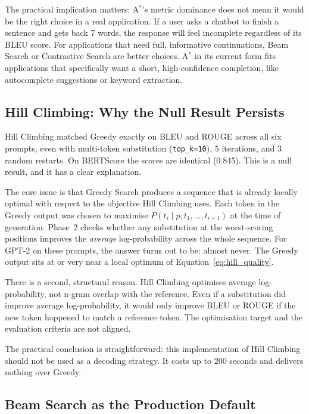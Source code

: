 \documentclass[12pt]{article}
\begin{document}
	The practical implication matters: A$^*$'s metric dominance does not mean it would be the right choice in a real application. If a user asks a chatbot to finish a sentence and gets back 7 words, the response will feel incomplete regardless of its BLEU score. For applications that need full, informative continuations, Beam Search or Contrastive Search are better choices. A$^*$ in its current form fits applications that specifically want a short, high-confidence completion, like autocomplete suggestions or keyword extraction.
	
	\subsection{Hill Climbing: Why the Null Result Persists}
	\label{sec:hillclimb_discussion}
	
	Hill Climbing matched Greedy exactly on BLEU and ROUGE across all six prompts, even with multi-token substitution (\texttt{top\_k=10}), 5 iterations, and 3 random restarts. On BERTScore the scores are identical (0.845). This is a null result, and it has a clear explanation.
	
	The core issue is that Greedy Search produces a sequence that is already locally optimal with respect to the objective Hill Climbing uses. Each token in the Greedy output was chosen to maximise $P(t_i \mid p, t_1, \ldots, t_{i-1})$ at the time of generation. Phase~2 checks whether any substitution at the worst-scoring positions improves the \emph{average} log-probability across the whole sequence. For GPT-2 on these prompts, the answer turns out to be: almost never. The Greedy output sits at or very near a local optimum of Equation~\eqref{eq:hill_quality}.
	
	There is a second, structural reason. Hill Climbing optimises average log-probability, not n-gram overlap with the reference. Even if a substitution did improve average log-probability, it would only improve BLEU or ROUGE if the new token happened to match a reference token. The optimisation target and the evaluation criteria are not aligned.
	
	The practical conclusion is straightforward: this implementation of Hill Climbing should not be used as a decoding strategy. It costs up to 200 seconds and delivers nothing over Greedy.
	
	\subsection{Beam Search as the Production Default}
	\label{sec:beam_discussion}
	
\end{document}
